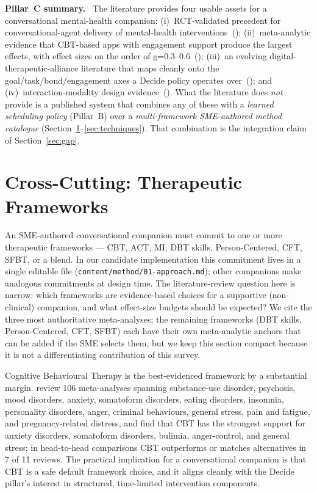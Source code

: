 \documentclass[10pt,conference]{article}
\newcommand{\secref}[1]{Section~\ref{#1}}
\renewcommand{\paragraph}[1]{\smallskip\par\noindent\textbf{#1}~\ignorespaces}
\begin{document}
\paragraph{Pillar~C summary.}
The literature provides four usable assets for a conversational
mental-health companion: (i)~RCT-validated precedent for
conversational-agent delivery of mental-health
interventions~(\cite{Fitzpatrick2017Woebot,Inkster2018Wysa,Heinz2025TherabotRCT});
(ii)~meta-analytic evidence that CBT-based apps with engagement
support produce the largest effects, with effect sizes on the order
of g=0.3--0.6~(\cite{Linardon2019Meta}); (iii)~an evolving
digital-therapeutic-alliance literature that maps cleanly onto the
goal/task/bond/engagement axes a Decide policy operates
over~(\cite{Henson2019DTA,Lederman2021DTASpecialIssue,MalouinLachance2025DTAReview});
and (iv)~interaction-modality design
evidence~(\cite{Mai2022CoachbotInteraction}). What the literature does
\emph{not} provide is a published system that combines any of
these with a \emph{learned scheduling policy} (Pillar~B) over a
\emph{multi-framework SME-authored method catalogue}
(\secref{sec:frameworks}--\ref{sec:techniques}). That combination is
the integration claim of \secref{sec:gap}.

\section{Cross-Cutting: Therapeutic Frameworks}\label{sec:frameworks}

An SME-authored conversational companion must commit to one or more
therapeutic frameworks --- CBT, ACT, MI, DBT skills, Person-Centered,
CFT, SFBT, or a blend. In our candidate implementation this commitment
lives in a single editable file
(\texttt{content/method/01-approach.md}); other companions make
analogous commitments at design time. The literature-review question
here is narrow: which frameworks are evidence-based choices for a
supportive (non-clinical) companion, and what effect-size budgets
should be expected? We cite the three most authoritative
meta-analyses; the remaining frameworks (DBT skills, Person-Centered,
CFT, SFBT) each have their own meta-analytic anchors that can be
added if the SME selects them, but we keep this section compact
because it is not a differentiating contribution of this survey.

Cognitive Behavioural Therapy is the best-evidenced framework by a
substantial margin. \cite{Hofmann2012CBTMeta} review 106 meta-analyses
spanning substance-use disorder, psychosis, mood disorders, anxiety,
somatoform disorders, eating disorders, insomnia, personality
disorders, anger, criminal behaviours, general stress, pain and
fatigue, and pregnancy-related distress, and find that CBT has the
strongest support for anxiety disorders, somatoform disorders,
bulimia, anger-control, and general stress; in head-to-head
comparisons CBT outperforms or matches alternatives in 7 of 11
reviews. The practical implication for a conversational companion is
that CBT is a safe default framework choice, and it aligns cleanly
with the Decide pillar's interest in structured, time-limited
intervention components.
\end{document}
